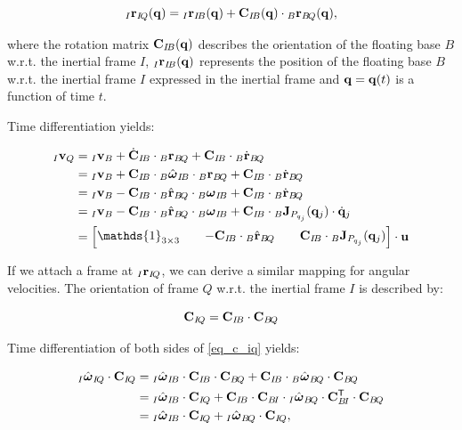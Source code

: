 \documentclass[10pt,landscape,a4paper]{article}
\newcommand\identity{\mathds{1}}
\newcommand\transpose{\mathsf{T}}
\newcommand\pos[3]{{}_#1\vr_{#2\!#3}}
\newcommand\posdot[3]{{}_#1\dot{\vr}_{#2\!#3}}
\newcommand\poshat[3]{{}_#1\hat{\vr}_{#2\!#3}}
\newcommand\comat[2]{\vC_{#1\!#2}}
\newcommand\dcomat[2]{\dot{\vC}_{#1\!#2}}
\newcommand\rotvel[3]{{}_#1\vom_{#2\!#3}}
\newcommand\rotvelhat[3]{{}_#1\hat{\vom}_{#2\!#3}}
\begin{document}
\begin{multicols}{2}
\begin{equation}
\pos{I}{I}{Q}(\vq) = \pos{I}{I}{B}(\vq) + \comat{I}{B}(\vq) \cdot \pos{B}{B}{Q}(\vq),
\end{equation}

where the rotation matrix $\comat{I}{B}(\vq)$ describes the orientation of the floating base $B$ w.r.t. the inertial frame $I$, $\pos{I}{I}{B}(\vq)$ represents the position of the floating base $B$ w.r.t. the inertial frame $I$ expressed in the inertial frame and $\mathbf q = \mathbf q(t)$ is a function of time $t$.


Time differentiation yields:

\begin{equation}
\begin{aligned}
{}_I \vv_{Q} 
&= {}_I \vv_{B} + \dcomat{I}{B} \cdot \pos{B}{B}{Q} + \comat{I}{B} \cdot \posdot{B}{B}{Q} \\
&= {}_I \vv_{B} + \comat{I}{B} \cdot \rotvelhat{B}{I}{B} \cdot \pos{B}{B}{Q} + \comat{I}{B} \cdot \posdot{B}{B}{Q} \\
&= {}_I \vv_{B} - \comat{I}{B} \cdot \poshat{B}{B}{Q} \cdot \rotvel{B}{I}{B} + \comat{I}{B} \cdot \posdot{B}{B}{Q} \\
&= {}_I \vv_{B} - \comat{I}{B} \cdot \poshat{B}{B}{Q} \cdot \rotvel{B}{I}{B} + \comat{I}{B} \cdot {}_B \vJ_{P_{q_j}}(\vq_j) \cdot \dot{\vq}_j \\
&=
\begin{bmatrix}
\identity_{3\times 3} && -\comat{I}{B} \cdot \poshat{B}{B}{Q} && \comat{I}{B} \cdot {}_B \vJ_{P_{q_j}}(\vq_j)
\end{bmatrix}
\cdot \vu
\end{aligned}
\end{equation}

If we attach a frame at $\pos{I}{I}{Q}$, we can derive a similar mapping for angular velocities. The orientation of frame $Q$ w.r.t. the inertial frame $I$ is described by:

\begin{equation}\label{eq_c_iq}
\comat{I}{Q} = \comat{I}{B} \cdot \comat{B}{Q}
\end{equation}

Time differentiation of both sides of \eqref{eq_c_iq} yields:

\begin{equation}
\begin{aligned}
\rotvelhat{I}{I}{Q} \cdot \comat{I}{Q}
&= \rotvelhat{I}{I}{B} \cdot \comat{I}{B} \cdot \comat{B}{Q} + \comat{I}{B} \cdot \rotvelhat{B}{B}{Q} \cdot \comat{B}{Q} \\
&= \rotvelhat{I}{I}{B} \cdot \comat{I}{Q} + \comat{I}{B} \cdot \comat{B}{I} \cdot \rotvelhat{I}{B}{Q} \cdot \comat{B}{I}^\transpose \cdot \comat{B}{Q} \\
&= \rotvelhat{I}{I}{B} \cdot \comat{I}{Q} + \rotvelhat{I}{B}{Q} \cdot \comat{I}{Q},
\end{aligned}
\end{equation}


\end{multicols}
\end{document}
